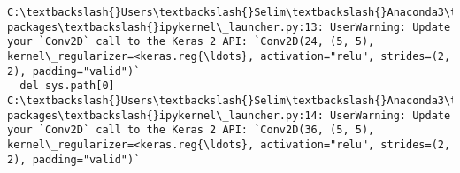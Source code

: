 \documentclass[11pt]{article}
\begin{document}
    \begin{Verbatim}[commandchars=\\\{\}]
C:\textbackslash{}Users\textbackslash{}Selim\textbackslash{}Anaconda3\textbackslash{}envs\textbackslash{}tfenv\textbackslash{}lib\textbackslash{}site-packages\textbackslash{}ipykernel\_launcher.py:13: UserWarning: Update your `Conv2D` call to the Keras 2 API: `Conv2D(24, (5, 5), kernel\_regularizer=<keras.reg{\ldots}, activation="relu", strides=(2, 2), padding="valid")`
  del sys.path[0]
C:\textbackslash{}Users\textbackslash{}Selim\textbackslash{}Anaconda3\textbackslash{}envs\textbackslash{}tfenv\textbackslash{}lib\textbackslash{}site-packages\textbackslash{}ipykernel\_launcher.py:14: UserWarning: Update your `Conv2D` call to the Keras 2 API: `Conv2D(36, (5, 5), kernel\_regularizer=<keras.reg{\ldots}, activation="relu", strides=(2, 2), padding="valid")`
  

\end{Verbatim}
\end{document}
